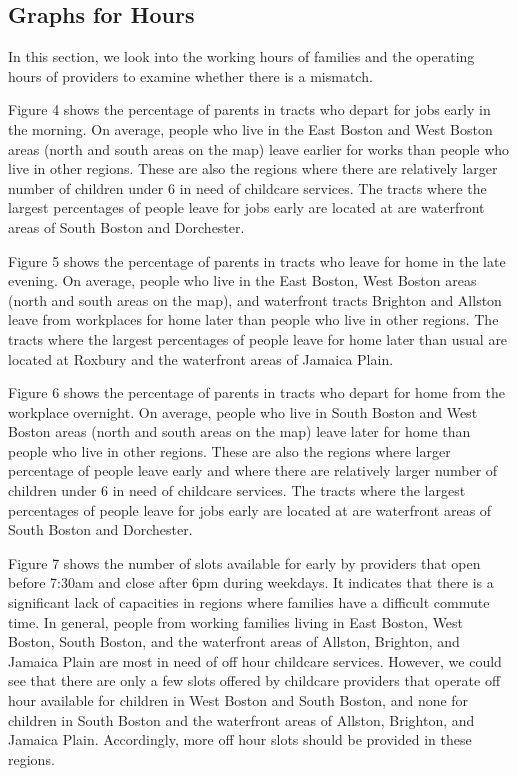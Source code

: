 \documentclass[man]{apa6}
\begin{document}
\subsection{Graphs for Hours}\label{graphs-for-hours}

In this section, we look into the working hours of families and the
operating hours of providers to examine whether there is a mismatch.

Figure 4 shows the percentage of parents in tracts who depart for jobs
early in the morning. On average, people who live in the East Boston and
West Boston areas (north and south areas on the map) leave earlier for
works than people who live in other regions. These are also the regions
where there are relatively larger number of children under 6 in need of
childcare services. The tracts where the largest percentages of people
leave for jobs early are located at are waterfront areas of South Boston
and Dorchester.

Figure 5 shows the percentage of parents in tracts who leave for home in
the late evening. On average, people who live in the East Boston, West
Boston areas (north and south areas on the map), and waterfront tracts
Brighton and Allston leave from workplaces for home later than people
who live in other regions. The tracts where the largest percentages of
people leave for home later than usual are located at Roxbury and the
waterfront areas of Jamaica Plain.

Figure 6 shows the percentage of parents in tracts who depart for home
from the workplace overnight. On average, people who live in South
Boston and West Boston areas (north and south areas on the map) leave
later for home than people who live in other regions. These are also the
regions where larger percentage of people leave early and where there
are relatively larger number of children under 6 in need of childcare
services. The tracts where the largest percentages of people leave for
jobs early are located at are waterfront areas of South Boston and
Dorchester.

Figure 7 shows the number of slots available for early by providers that
open before 7:30am and close after 6pm during weekdays. It indicates
that there is a significant lack of capacities in regions where families
have a difficult commute time. In general, people from working families
living in East Boston, West Boston, South Boston, and the waterfront
areas of Allston, Brighton, and Jamaica Plain are most in need of off
hour childcare services. However, we could see that there are only a few
slots offered by childcare providers that operate off hour available for
children in West Boston and South Boston, and none for children in South
Boston and the waterfront areas of Allston, Brighton, and Jamaica Plain.
Accordingly, more off hour slots should be provided in these regions.
\end{document}
